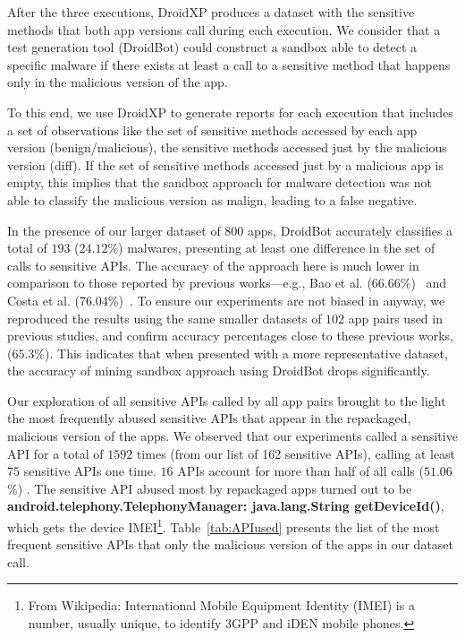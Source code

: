 After the three executions, DroidXP produces a dataset with the sensitive methods that both app versions call during each execution. We consider that a test
generation tool (DroidBot) could construct a sandbox able to detect a specific malware if there exists at least a call to a sensitive method that happens
only in the malicious version of the app. 

To this end, we use DroidXP to generate reports for each execution that includes a set of observations like the set of sensitive methods accessed by each app version (benign/malicious),
the sensitive methods accessed just by the malicious version (diff). If the set of sensitive methods accessed just by a malicious app is empty,
this implies that the sandbox approach for malware detection was not able to classify the malicious version as malign, leading to a false negative.

In the presence of our larger dataset of $800$ apps, DroidBot accurately classifies a total of $193$ ($24.12$\%) malwares, presenting
at least one difference in the set of calls to sensitive APIs. The accuracy of the approach here is much lower in comparison to those reported by previous works---e.g.,
Bao et al. (66.66\%)~\cite{DBLP:conf/wcre/BaoLL18} and Costa et al. (76.04\%)~\cite{DBLP:journals/jss/CostaMMSSBNR22}. To ensure our experiments are not biased in anyway,
we reproduced the results using the same smaller datasets of $102$ app pairs used in previous studies, and confirm accuracy percentages close to these previous works, ($65.3$\%).
This indicates that when presented with a more representative dataset, the accuracy of mining sandbox approach using DroidBot drops significantly. 

Our exploration of all sensitive APIs called by all app pairs brought to the light the most frequently abused sensitive APIs that
appear in the repackaged, malicious version of the apps.
We observed that our experiments called a sensitive API for a total of $1592$ times (from our list of 162 sensitive APIs), calling at least $75$
sensitive APIs one time. $16$ APIs account for more than half of all calls ($51.06$\%) .
The sensitive API abused most by repackaged apps turned out to be \textbf{android.telephony.TelephonyManager: java.lang.String getDeviceId()}, which gets the device
IMEI\footnote{From Wikipedia: International Mobile Equipment Identity (IMEI) is a number, usually unique, to identify 3GPP and iDEN mobile phones.}.
Table~\ref{tab:APIused} presents the list of the most frequent sensitive APIs that only the malicious
version of the apps in our dataset call.

